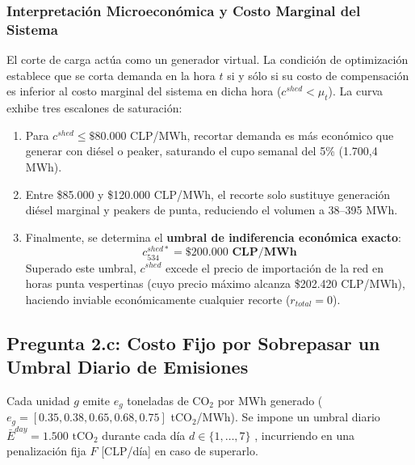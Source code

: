 \documentclass[10pt,letterpaper]{article}
\begin{document}
\subsubsection*{Interpretación Microeconómica y Costo Marginal del Sistema}
El corte de carga actúa como un generador virtual. La condición de optimización establece que se corta demanda en la hora $t$ si y sólo si su costo de compensación es inferior al costo marginal del sistema en dicha hora ($c^{shed} < \mu_t$). La curva exhibe tres escalones de saturación:
\begin{enumerate}
    \item Para $c^{shed} \le \$80.000$ CLP/MWh, recortar demanda es más económico que generar con diésel o peaker, saturando el cupo semanal del 5\% (1.700,4 MWh).
    \item Entre \$85.000 y \$120.000 CLP/MWh, el recorte solo sustituye generación diésel marginal y peakers de punta, reduciendo el volumen a 38--395 MWh.
    \item Finalmente, se determina el \textbf{umbral de indiferencia económica exacto}:
    \begin{equation}
        c^{shed*}_{534} = \mathbf{\$200.000 \text{ CLP/MWh}}
    \end{equation}
    Superado este umbral, $c^{shed}$ excede el precio de importación de la red en horas punta vespertinas (cuyo precio máximo alcanza \$202.420 CLP/MWh), haciendo inviable económicamente cualquier recorte ($r_{total} = 0$).
\end{enumerate}

\subsection{Pregunta 2.c: Costo Fijo por Sobrepasar un Umbral Diario de Emisiones}
\label{subsec:2c}

Cada unidad $g$ emite $e_g$ toneladas de $\text{CO}_2$ por MWh generado ($e_g = [0.35, 0.38, 0.65, 0.68, 0.75]$ t$\text{CO}_2$/MWh). Se impone un umbral diario $\bar{E}^{day} = 1.500 \text{ tCO}_2$ durante cada día $d \in \{1, \ldots, 7\}$ , incurriendo en una penalización fija $F$ [CLP/día] en caso de superarlo.
\end{document}
